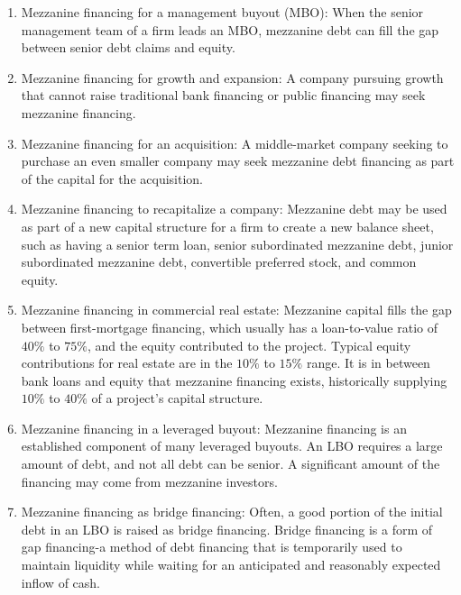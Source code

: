 \documentclass[11pt]{article}
\begin{document}
\begin{enumerate}
  \item Mezzanine financing for a management buyout (MBO): When the senior management team of a firm leads an MBO, mezzanine debt can fill the gap between senior debt claims and equity.

  \item Mezzanine financing for growth and expansion: A company pursuing growth that cannot raise traditional bank financing or public financing may seek mezzanine financing.

  \item Mezzanine financing for an acquisition: A middle-market company seeking to purchase an even smaller company may seek mezzanine debt financing as part of the capital for the acquisition.

  \item Mezzanine financing to recapitalize a company: Mezzanine debt may be used as part of a new capital structure for a firm to create a new balance sheet, such as having a senior term loan, senior subordinated mezzanine debt, junior subordinated mezzanine debt, convertible preferred stock, and common equity.

  \item Mezzanine financing in commercial real estate: Mezzanine capital fills the gap between first-mortgage financing, which usually has a loan-to-value ratio of $40 \%$ to $75 \%$, and the equity contributed to the project. Typical equity contributions for real estate are in the $10 \%$ to $15 \%$ range. It is in between bank loans and equity that mezzanine financing exists, historically supplying $10 \%$ to $40 \%$ of a project's capital structure.

  \item Mezzanine financing in a leveraged buyout: Mezzanine financing is an established component of many leveraged buyouts. An LBO requires a large amount of debt, and not all debt can be senior. A significant amount of the financing may come from mezzanine investors.

  \item Mezzanine financing as bridge financing: Often, a good portion of the initial debt in an LBO is raised as bridge financing. Bridge financing is a form of gap financing-a method of debt financing that is temporarily used to maintain liquidity while waiting for an anticipated and reasonably expected inflow of cash.

\end{enumerate}
\end{document}
